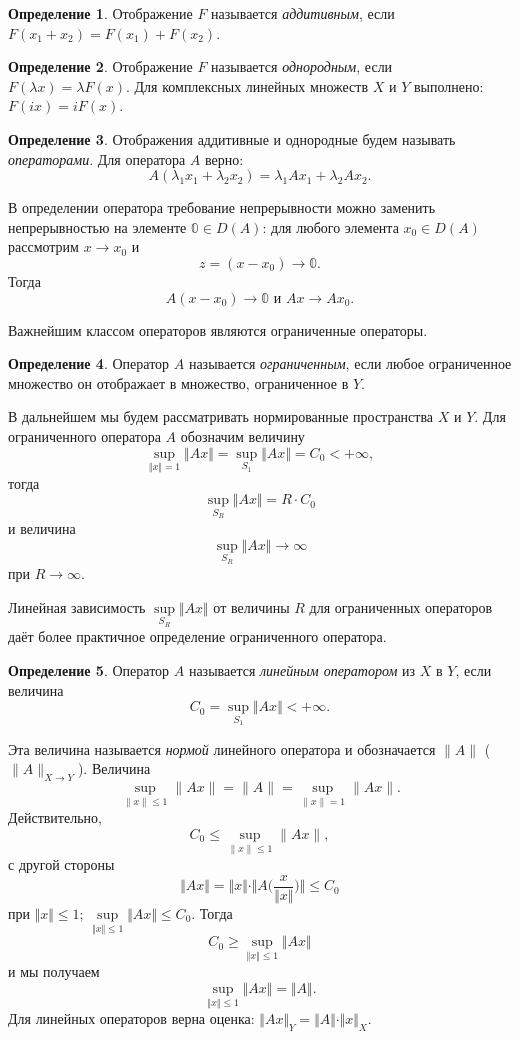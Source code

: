 \documentclass[12pt,a4paper,titlepage,oneside]{book}
\theoremstyle{definition}
\newtheorem*{definition}{Определение}
\theoremstyle{plain}
\theoremstyle{break}
\theoremstyle{remark}
\theoremstyle{remark}
\theoremstyle{remark}
\theoremstyle{remark}
\theoremstyle{plain}
\theoremstyle{plain}
\begin{document}
\begin{definition}
Отображение $F$ называется \textit{аддитивным}, если $F(x_1+x_2)=F(x_1)+F(x_2)$.
\end{definition}

\begin{definition}
Отображение $F$ называется \textit{однородным}, если $F(\lambda x)=\lambda F(x)$. Для комплексных линейных множеств $X$ и $Y$ выполнено: $F(ix)=iF(x)$.
\end{definition}

\begin{definition}
Отображения аддитивные и однородные будем называть \textit{операторами}. Для оператора $A$ верно:
$$A(\lambda_1x_1+\lambda_2x_2)=\lambda_1Ax_1+\lambda_2Ax_2.$$

\end{definition}

В определении оператора требование непрерывности можно заменить непрерывностью на элементе $\mathbb{0} \in D(A)$: для любого элемента $x_0\in D(A)$ рассмотрим $x \to x_0$ и 
$$z=(x-x_0) \to \mathbb{0}.$$
Тогда 
$$A(x-x_0)\to \mathbb{0} \mbox{ и } Ax \to Ax_0.$$

Важнейшим классом операторов являются ограниченные операторы.

\begin{definition} Оператор $A$ называется \textit{ограниченным}, если любое ограниченное множество он отображает в множество, ограниченное в $Y$.
\end{definition}

В дальнейшем мы будем рассматривать нормированные пространства $X$ и $Y$.
Для ограниченного оператора $A$  обозначим величину 
$$\underset{\Vert x\Vert=1}{\sup}\Vert Ax \Vert =\underset{S_1}{\sup}\Vert Ax \Vert =C_0<+\infty,$$
тогда
$$\underset{S_R}{\sup}\Vert Ax \Vert=R\cdot C_0$$
и величина 
$$\underset{S_R}{\sup}\Vert Ax \Vert\to\infty$$
при $R\to\infty$.

Линейная зависимость
$\underset{S_R}{\sup}\Vert Ax \Vert$
от величины $R$ для ограниченных операторов даёт более практичное определение ограниченного оператора.

\begin{definition} Оператор $A$ называется \textit{линейным оператором} из $X$ в $Y$, если величина 
$$C_0=\underset{S_1}{\sup}\Vert Ax \Vert<+\infty.$$
\end{definition}
Эта величина называется \textit{нормой} линейного оператора и обозначается $\lVert A \rVert$ ($\lVert A \rVert_{X \to Y}$).
Величина 
$$\underset{\lVert x \rVert \leqslant 1}{\sup}\lVert Ax \rVert = \lVert A \rVert = \underset{\lVert x \rVert = 1}{\sup}\lVert Ax \rVert.$$
Действительно,
$$C_0 \leqslant \underset{\lVert x \rVert \leqslant 1}{\sup}\lVert Ax \rVert,$$
с другой стороны
$$\Vert Ax \Vert=
\Vert x \Vert \cdot \Vert A \big( \frac{x}{\Vert x \Vert} \big) \Vert \leqslant C_0$$
при $\Vert x \Vert \leqslant 1$; 
$\underset{\Vert x\Vert \leqslant 1}{\sup}\Vert Ax \Vert \leqslant C_0$.
Тогда
$$C_0 \geqslant\underset{\Vert x\Vert \leqslant 1}{\sup}\Vert Ax \Vert$$
и мы получаем 
$$\underset{\Vert x\Vert \leqslant 1}{\sup}\Vert Ax \Vert =\Vert A \Vert.$$
Для линейных операторов верна оценка: $\Vert Ax \Vert _{Y} =\Vert A \Vert \cdot \Vert x \Vert_{X} $.
\end{document}
